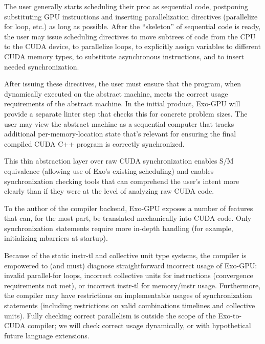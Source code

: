\filbreak
The user generally starts scheduling their proc as sequential code, postponing substituting GPU instructions and inserting parallelization directives (parallelize for loop, etc.) as long as possible.
After the ``skeleton'' of sequential code is ready, the user may issue scheduling directives to move subtrees of code from the CPU to the CUDA device, to parallelize loops, to explicitly assign variables to different CUDA memory types, to substitute asynchronous instructions, and to insert needed synchronization.

\filbreak
After issuing these directives, the user must ensure that the program, when dynamically executed on the abstract machine, meets the correct usage requirements of the abstract machine.
In the initial product, Exo-GPU will provide a separate linter step that checks this for concrete problem sizes.
The user may view the abstract machine as a sequential computer that tracks additional per-memory-location state that's relevant for ensuring the final compiled CUDA C++ program is correctly synchronized.

\filbreak
This thin abstraction layer over raw CUDA synchronization enables S/M equivalence (allowing use of Exo's existing scheduling) and enables synchronization checking tools that can comprehend the user's intent more clearly than if they were at the level of analyzing raw CUDA code.

\filbreak
{}

To the author of the compiler backend, Exo-GPU exposes a number of features that can, for the most part, be translated mechanically into CUDA code.
Only synchronization statements require more in-depth handling (for example, initializing mbarriers at startup).

\filbreak
Because of the static instr-tl and collective unit type systems, the compiler is empowered to (and must) diagnose straightforward incorrect usage of Exo-GPU: invalid parallel-for loops, incorrect collective units for instructions (convergence requirements not met), or incorrect instr-tl for memory/instr usage.
Furthermore, the compiler may have restrictions on implementable usages of synchronization statements (including restrictions on valid combinations timelines and collective units).
Fully checking correct parallelism is outside the scope of the Exo-to-CUDA compiler; we will check correct usage dynamically, or with hypothetical future language extensions.

\filbreak
{}

